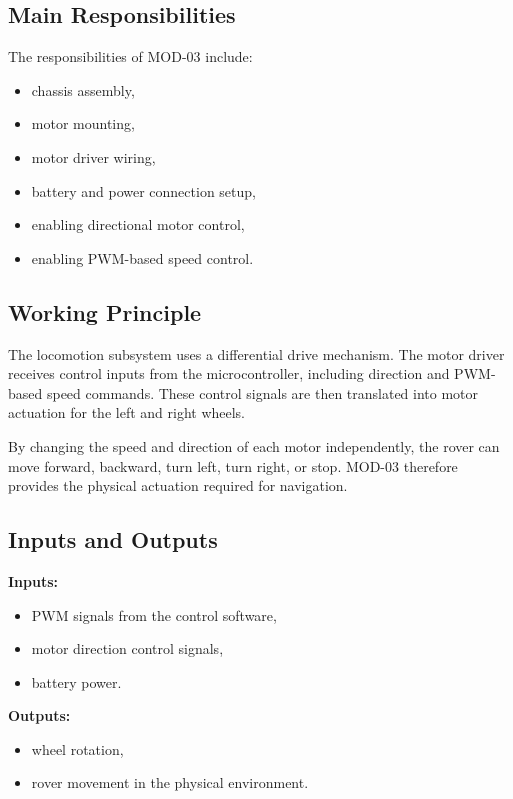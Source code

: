 \documentclass[12pt,a4paper]{article}
\begin{document}
\subsection{Main Responsibilities}

The responsibilities of MOD-03 include:

\begin{itemize}[leftmargin=1.2cm]
    \item chassis assembly,
    \item motor mounting,
    \item motor driver wiring,
    \item battery and power connection setup,
    \item enabling directional motor control,
    \item enabling PWM-based speed control.
\end{itemize}

\subsection{Working Principle}

The locomotion subsystem uses a differential drive mechanism. The motor driver receives control inputs from the microcontroller, including direction and PWM-based speed commands. These control signals are then translated into motor actuation for the left and right wheels.

By changing the speed and direction of each motor independently, the rover can move forward, backward, turn left, turn right, or stop. MOD-03 therefore provides the physical actuation required for navigation.

\subsection{Inputs and Outputs}

\textbf{Inputs:}
\begin{itemize}[leftmargin=1.2cm]
    \item PWM signals from the control software,
    \item motor direction control signals,
    \item battery power.
\end{itemize}

\textbf{Outputs:}
\begin{itemize}[leftmargin=1.2cm]
    \item wheel rotation,
    \item rover movement in the physical environment.
\end{itemize}
\end{document}
